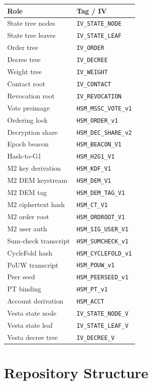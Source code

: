 \documentclass[11pt, a4paper]{article}
\theoremstyle{plain}
\theoremstyle{definition}
\theoremstyle{remark}
\begin{document}
\begin{longtable}{l|l}
\textbf{Role} & \textbf{Tag / IV} \\
\endhead
\hline
State tree nodes & \texttt{IV\_STATE\_NODE} \\
State tree leaves & \texttt{IV\_STATE\_LEAF} \\
Order tree & \texttt{IV\_ORDER} \\
Decree tree & \texttt{IV\_DECREE} \\
Weight tree & \texttt{IV\_WEIGHT} \\
Contact root & \texttt{IV\_CONTACT} \\
Revocation root & \texttt{IV\_REVOCATION} \\
Vote preimage & \texttt{HSM\_MSSC\_VOTE\_v1} \\
Ordering lock & \texttt{HSM\_ORDER\_v1} \\
Decryption share & \texttt{HSM\_DEC\_SHARE\_v2} \\
Epoch beacon & \texttt{HSM\_BEACON\_V1} \\
Hash-to-G1 & \texttt{HSM\_H2G1\_V1} \\
M2 key derivation & \texttt{HSM\_KDF\_V1} \\
M2 DEM keystream & \texttt{HSM\_DEM\_V1} \\
M2 DEM tag & \texttt{HSM\_DEM\_TAG\_V1} \\
M2 ciphertext hash & \texttt{HSM\_CT\_V1} \\
M2 order root & \texttt{HSM\_ORDROOT\_V1} \\
M2 user auth & \texttt{HSM\_SIG\_USER\_V1} \\
Sum-check transcript & \texttt{HSM\_SUMCHECK\_v1} \\
CycleFold hash & \texttt{HSM\_CYCLEFOLD\_v1} \\
PoUW transcript & \texttt{HSM\_POUW\_v1} \\
Peer seed & \texttt{HSM\_PEERSEED\_v1} \\
PT binding & \texttt{HSM\_PT\_v1} \\
Account derivation & \texttt{HSM\_ACCT} \\
Vesta state node & \texttt{IV\_STATE\_NODE\_V} \\
Vesta state leaf & \texttt{IV\_STATE\_LEAF\_V} \\
Vesta decree tree & \texttt{IV\_DECREE\_V} \\
\bottomrule
\end{longtable}

\section{Repository Structure}
\end{document}
